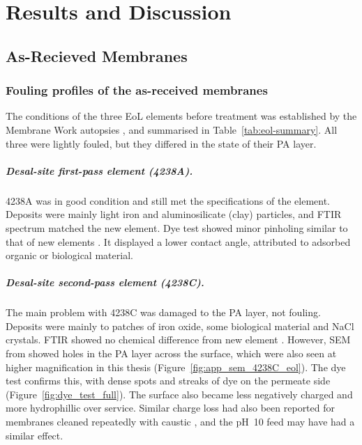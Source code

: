 \chapter{Results and Discussion}
\label{ch:results}

\section{As-Recieved Membranes}
\subsection{Fouling profiles of the as-received membranes}
\label{sec:res-fouling}
The conditions of the three EoL elements before treatment was established by the Membrane Work autopsies \citep{MembraneWorks2026Mine,MembraneWorks2025Desal}, and summarised in Table~\ref{tab:eol-summary}. All three were lightly fouled, but they differed in the state of their PA layer.

\paragraph{Desal-site first-pass element (4238A).}
\label{sec:red-fouling-4238A}
4238A was in good condition and still met the specifications of the element. Deposits were mainly light iron and aluminosilicate (clay) particles, and FTIR spectrum matched the new element. Dye test showed minor pinholing similar to that of new elements \citep{MembraneWorks2025Desal}. It displayed a lower contact angle, attributed to adsorbed organic or biological material. 

\paragraph{Desal-site second-pass element (4238C).}
\label{sec:res-fouling-4238C}
The main problem with 4238C was damaged to the PA layer, not fouling. Deposits were mainly to patches of iron oxide, some biological material and NaCl crystals. FTIR showed no chemical difference from new element \citep{MembraneWorks2025Desal}. However, SEM from \citet{MembraneWorks2025Desal} showed holes in the PA layer across the surface, which were also seen at higher magnification in this thesis (Figure~\ref{fig:app_sem_4238C_eol}). The dye test confirms this, with dense spots and streaks of dye on the permeate side (Figure~\ref{fig:dye_test_full}). The surface also became less negatively charged and more hydrophillic over service. Similar charge loss had also been reported for membranes cleaned repeatedly with caustic \citep{MembraneWorks2025Desal}, and the pH~10 feed may have had a similar effect.


